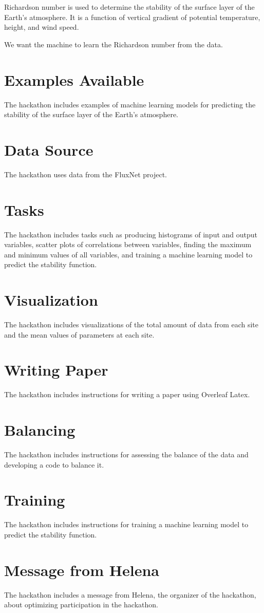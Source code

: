 \documentclass{article}
\begin{document}
Richardson number is used to determine the stability of the surface layer of the Earth's atmosphere. It is a function of vertical gradient of potential temperature, height, and wind speed.

We want the machine to learn the Richardson number from the data.
\section{Examples Available}

The hackathon includes examples of machine learning models for predicting the stability of the surface layer of the Earth's atmosphere.

\section{Data Source}

The hackathon uses data from the FluxNet project.

\section{Tasks}

The hackathon includes tasks such as producing histograms of input and output variables, scatter plots of correlations between variables, finding the maximum and minimum values of all variables, and training a machine learning model to predict the stability function.

\section{Visualization}

The hackathon includes visualizations of the total amount of data from each site and the mean values of parameters at each site.

\section{Writing Paper}

The hackathon includes instructions for writing a paper using Overleaf Latex.

\section{Balancing}

The hackathon includes instructions for assessing the balance of the data and developing a code to balance it.

\section{Training}

The hackathon includes instructions for training a machine learning model to predict the stability function.

\section{Message from Helena}

The hackathon includes a message from Helena, the organizer of the hackathon, about optimizing participation in the hackathon.
\end{document}
